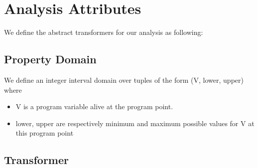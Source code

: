 \section{Analysis Attributes}
We define the abstract transformers for our analysis as following:\\
\subsection{Property Domain}
We define an integer interval domain over tuples of the form (V, lower, upper) where
\begin{itemize}
\item V is a program variable alive at the program point.
\item lower, upper are respectively minimum and maximum possible values for V at this program point
\end{itemize}
\subsection{Transformer}

